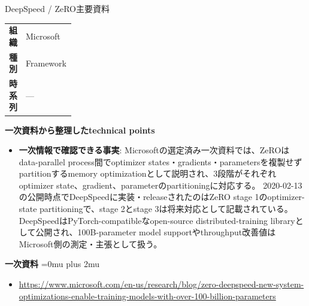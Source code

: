 \begin{technicalnote}{DeepSpeed / ZeRO}{主要資料}
\begingroup
\begin{tabularx}{\linewidth}{@{}>{\bfseries}p{0.22\linewidth}X@{}}
組織 & Microsoft \\
種別 & Framework \\
時系列 & — \\
\end{tabularx}
\smallskip
{\bfseries 一次資料から整理したtechnical points}
\begin{itemize}[leftmargin=1.5em,itemsep=0.35em]
\item \textbf{一次情報で確認できる事実}: Microsoftの選定済み一次資料では、ZeROはdata-parallel process間でoptimizer states・gradients・parametersを複製せずpartitionするmemory optimizationとして説明され、3段階がそれぞれoptimizer state、gradient、parameterのpartitioningに対応する。 2020-02-13の公開時点でDeepSpeedに実装・releaseされたのはZeRO stage 1のoptimizer-state partitioningで、stage 2とstage 3は将来対応として記載されている。 DeepSpeedはPyTorch-compatibleなopen-source distributed-training libraryとして公開され、100B-parameter model supportやthroughput改善値はMicrosoft側の測定・主張として扱う。
\end{itemize}
\begin{minipage}{\linewidth}
\begin{samepage}
{\bfseries 一次資料}
\begingroup\sloppy
\Urlmuskip=0mu plus 2mu\relax
\begin{itemize}[leftmargin=1.5em,itemsep=0.25em]
\item {\scriptsize\url{https://www.microsoft.com/en-us/research/blog/zero-deepspeed-new-system-optimizations-enable-training-models-with-over-100-billion-parameters}}
\end{itemize}
\endgroup
\end{samepage}
\end{minipage}
\endgroup
\end{technicalnote}
\medskip

